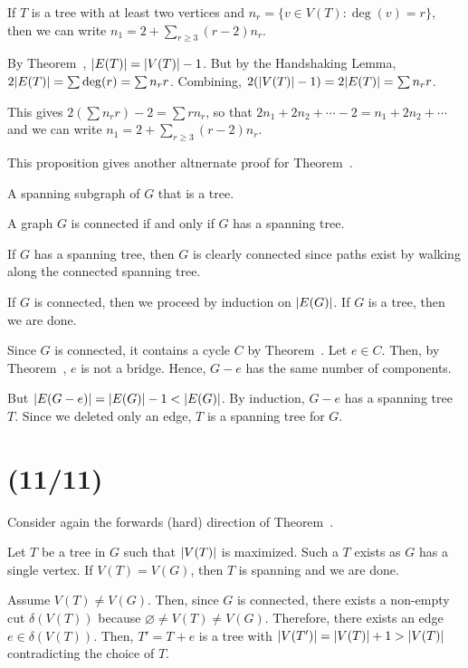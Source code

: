 \documentclass[class=math239,notes,tikz]{agony}
\begin{document}
\begin{prop}
  If $T$ is a tree with at least two vertices
  and $n_r = \{ v \in V(T) : \deg(v) = r \}$, then we can write
  $n_1 = 2 + \sum_{r \geq 3} (r-2) n_r$.
\end{prop}
\begin{prf}
  By Theorem~, $\abs{E(T)} = \abs{V(T)} - 1$.
  But by the Handshaking Lemma, $2\abs{E(T)} = \sum \deg(r) = \sum n_r r$.
  Combining, $2(\abs{V(T)}-1) = 2\abs{E(T)} = \sum n_r r$.

  This gives $2(\sum n_r r) - 2 = \sum r n_r$,
  so that $2n_1 + 2n_2 + \dotsb - 2 = n_1 + 2n_2 + \dotsb$
  and we can write $n_1 = 2 + \sum_{r \geq 3}(r-2)n_r$.
\end{prf}

This proposition gives another altnernate proof for Theorem~.

\begin{defn}
  A spanning subgraph of $G$ that is a tree.
\end{defn}

\begin{theorem}[5.2.1]\label{thm:conspan}
  A graph $G$ is connected if and only if $G$ has a spanning tree.
\end{theorem}
\begin{prf}
  If $G$ has a spanning tree, then $G$ is clearly connected
  since paths exist by walking along the connected spanning tree.

  If $G$ is connected, then we proceed by induction on $\abs{E(G)}$.
  If $G$ is a tree, then we are done.

  Since $G$ is connected, it contains a cycle $C$ by Theorem~.
  Let $e \in C$.
  Then, by Theorem~, $e$ is not a bridge.
  Hence, $G-e$ has the same number of components.

  But $\abs{E(G-e)} = \abs{E(G)} - 1 < \abs{E(G)}$.
  By induction, $G-e$ has a spanning tree $T$.
  Since we deleted only an edge, $T$ is a spanning tree for $G$.
\end{prf}

\section{(11/11)}

Consider again the forwards (hard) direction of Theorem~.

\begin{prf}
  Let $T$ be a tree in $G$ such that $\abs{V(T)}$ is maximized.
  Such a $T$ exists as $G$ has a single vertex.
  If $V(T) = V(G)$, then $T$ is spanning and we are done.

  Assume $V(T) \neq V(G)$.
  Then, since $G$ is connected, there exists a non-empty cut $\delta(V(T))$
  because $\varnothing \neq V(T) \neq V(G)$.
  Therefore, there exists an edge $e \in \delta(V(T))$.
  Then, $T' = T + e$ is a tree with $\abs{V(T')} = \abs{V(T)} + 1 > \abs{V(T)}$
  contradicting the choice of $T$.
\end{prf}
\end{document}
